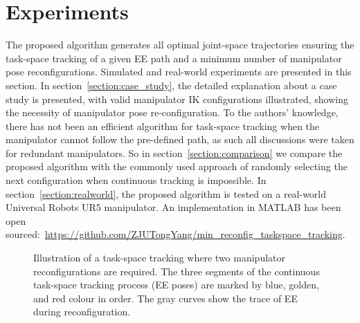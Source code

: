 \documentclass[letterpaper, 10 pt, conference]{ieeeconf}  %
\begin{document}
\section{Experiments}\label{section:experiments}
The proposed algorithm generates all optimal joint-space trajectories ensuring the task-space tracking of a given EE path and a minimum number of manipulator pose reconfigurations. Simulated and real-world experiments are presented in this section. 
In section~\ref{section:case_study}, the detailed explanation about a case study is presented, with valid manipulator IK configurations illustrated, showing the necessity of manipulator pose re-configuration. 
To the authors' knowledge, there has not been an efficient algorithm for task-space tracking when the manipulator cannot follow the pre-defined path, as such all discussions were taken for redundant manipulators. So in section~\ref{section:comparison} we compare the proposed algorithm with the commonly used approach of randomly selecting the next configuration when continuous tracking is impossible.
In section~\ref{section:realworld}, the proposed algorithm is tested on a real-world Universal Robots UR5 manipulator. 
An implementation in MATLAB has been open sourced:~\url{https://github.com/ZJUTongYang/min_reconfig_taskspace_tracking}. 



\begin{figure}[t]
\centering
{}
\caption{Illustration of a task-space tracking where two manipulator reconfigurations are required. The three segments of the continuous task-space tracking process (EE poses) are marked by blue, golden, and red colour in order. The gray curves show the trace of EE during reconfiguration.}\label{fig:case_study}
\vspace{-0.5cm}
\end{figure}
\end{document}
